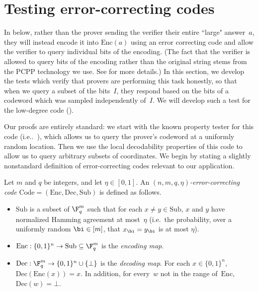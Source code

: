 \documentclass[11pt]{article}
\newcommand{\codec}{\mathrm{Code}}
\newcommand{\codee}{\mathrm{Enc}}
\newcommand{\coded}{\mathrm{Dec}}
\newcommand{\codes}{\mathrm{Sub}}
\begin{document}
\section{Testing error-correcting codes}\label{sec:error}

In  below,
rather than the prover sending the verifier their entire ``large" answer~$a$,
they will instead encode it into $\codee(a)$ using an error correcting code
and allow the verifier to query individual bits of the encoding.
(The fact that the verifier is allowed to query bits of the encoding rather than the original string
stems from the PCPP technology we use. See  for more details.)
In this section, we develop the tests which verify that provers are performing this task honestly,
so that when we query a subset of the bits~$I$,
they respond based on the bits of a codeword which was sampled independently of~$I$.
We will develop such a test for the low-degree code ().

Our proofs are entirely standard: we start with the known property tester for this code (i.e..\ ),
which allows us to query the prover's codeword at a uniformly random location.
Then we use the local decodability properties of this code to allow us to query arbitrary subsets of coordinates.
We begin by stating a slightly nonstandard definition of error-correcting codes relevant to our application.

\begin{definition}\label{def:error-correcting-code}
Let $m$ and $q$ be integers,
and let $\eta \in [0, 1]$.
An \emph{$(n, m, q, \eta)$-error-correcting code} $\codec = (\codee,\coded,\codes)$ is defined as follows.
\begin{itemize}
\item[$\circ$] $\codes$ is a subset of $\F_q^m$ such that for each $x \neq y \in \codes$, $x$ and $y$ have normalized Hamming agreement at most~$\eta$
		(i.e.\ the probability, over a uniformly random $\bi \in [m]$, that $x_{\bi} = y_{\bi}$ is at most $\eta$).
\item[$\circ$] $\codee:\{0, 1\}^n \rightarrow \codes \subseteq \F_q^m$ is the \emph{encoding map}.
\item[$\circ$] $\coded: \F_q^m \rightarrow \{0, 1\}^n \cup \{\bot\}$ is the \emph{decoding map}.
		For each $x \in \{0, 1\}^n$, $\coded(\codee(x)) = x$.
		In addition, for every~$w$ not in the range of~$\codee$, $\coded(w) = \bot$.
\end{itemize}
\end{definition}
\end{document}
